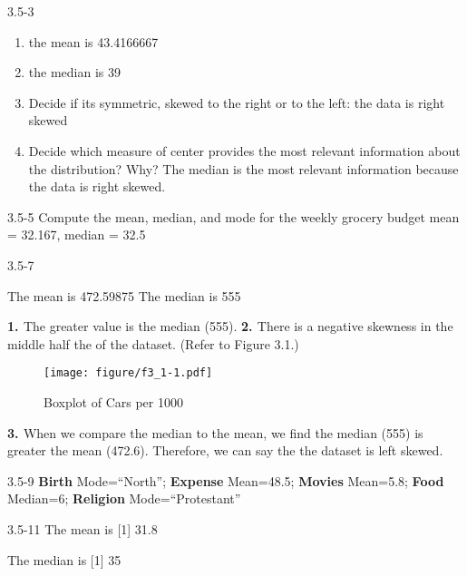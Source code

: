 \begin{exsol@solution}{3.5-3}
\begin{enumerate}
\item the mean is 43.4166667
\item the median is 39
\item Decide if its symmetric, skewed to the right or to the left: the data is right skewed
\item Decide which measure of center provides the most relevant information about the distribution? Why?  The median is the most relevant information because the data is right skewed.
\end{enumerate}

\end{exsol@solution}
\begin{exsol@solution}{3.5-5}
	Compute the mean, median, and mode for the weekly grocery budget
	mean = 32.167, median = 32.5

\end{exsol@solution}
\begin{exsol@solution}{3.5-7}



    The mean is 472.59875
    The median is 555

{\bf{1. }} The greater value is the median (555).  {\bf{2. }} There is a negative skewness in the middle half the of the dataset.  (Refer to Figure 3.1.)

\begin{figure}[htbp] %
   \centering
   \texttt{[image: figure/f3\_1-1.pdf]}
   \caption{Boxplot of Cars per 1000}
   \label{fig:f3_1}
\end{figure}

{\bf{3. }} When we compare the median to the mean, we find the median (555) is greater the mean (472.6).  Therefore, we can say the the dataset is left skewed.

\end{exsol@solution}
\begin{exsol@solution}{3.5-9}
     {\bf{Birth}} Mode=``North'';   {\bf{Expense}} Mean=48.5; {\bf{Movies}} Mean=5.8; {\bf{Food}} Median=6;  {\bf{Religion}} Mode=``Protestant''

\end{exsol@solution}
\begin{exsol@solution}{3.5-11}
	The mean is
[1] 31.8


	The median is
[1] 35


\end{exsol@solution}

